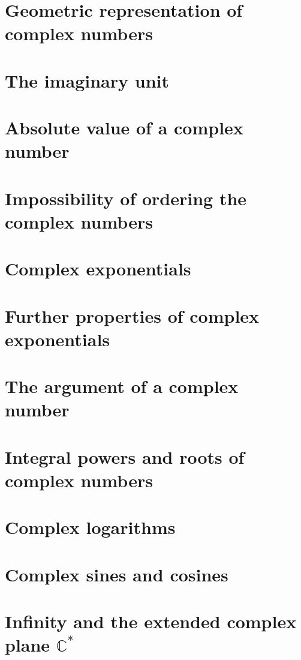 \documentclass[class=mike-apostol-mathematical-analysis,crop=false]{standalone}
\begin{document}
\section{Geometric representation of complex numbers}

\section{The imaginary unit}

\section{Absolute value of a complex number}

\section{Impossibility of ordering the complex numbers}

\section{Complex exponentials}

\section{Further properties of complex exponentials}

\section{The argument of a complex number}

\section{Integral powers and roots of complex numbers}

\section{Complex logarithms}

\section{Complex sines and cosines}

\section{Infinity and the extended complex plane $\mathbb{C}^{*}$}
\end{document}
